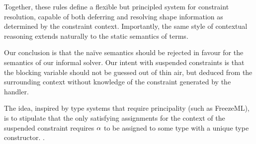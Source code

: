 \documentclass[acmsmall,screen,nonacm]{acmart}
\begin{document}
Together, these rules define a flexible but principled system for constraint resolution,
capable of both deferring and resolving shape information as determined by the constraint context.
Importantly, the same style of contextual reasoning extends naturally to the static semantics of terms.

\begin{version}{}
Our conclusion is that the na\"ive semantics should be rejected in favour
for the semantics of our informal solver. Our intent with suspended
constraints is that the blocking variable should not be guessed out of thin
air, but deduced from the surrounding context without knowledge of the
constraint generated by the handler.

The idea, inspired by type systems that require principality (such as
FreezeML), is to stipulate that the only satisfying assignments for the
context of the suspended constraint requires $\alpha$ to be assigned to some
type with a unique type constructor.
.








\end{version}
\end{document}
